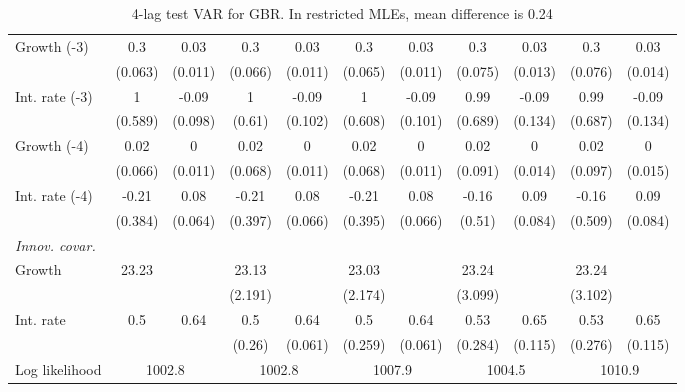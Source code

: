 \begin{table}[htbp]
\begin{tabular}{@{\extracolsep{4pt}}lcccccccccc@{}}
\quad Growth (-3) 	 &0.3 	 & 0.03 	 & 0.3 	 & 0.03 	 & 0.3 	 & 0.03 	 & 0.3 	 & 0.03 	 & 0.3 	 & 0.03	 \\ 
 		 & (0.063) 	 & (0.011) 	 & (0.066) 	 & (0.011) 	 & (0.065) 	 & (0.011) 	 & (0.075) 	 & (0.013) 	 & (0.076) 	 & (0.014) 	 \\ 
\quad Int. rate (-3) 	 &1 	 & -0.09 	 & 1 	 & -0.09 	 & 1 	 & -0.09 	 & 0.99 	 & -0.09 	 & 0.99 	 & -0.09	 \\ 
 		 & (0.589) 	 & (0.098) 	 & (0.61) 	 & (0.102) 	 & (0.608) 	 & (0.101) 	 & (0.689) 	 & (0.134) 	 & (0.687) 	 & (0.134) 	 \\ 
\quad Growth (-4) 	 &0.02 	 & 0 	 & 0.02 	 & 0 	 & 0.02 	 & 0 	 & 0.02 	 & 0 	 & 0.02 	 & 0	 \\ 
 		 & (0.066) 	 & (0.011) 	 & (0.068) 	 & (0.011) 	 & (0.068) 	 & (0.011) 	 & (0.091) 	 & (0.014) 	 & (0.097) 	 & (0.015) 	 \\ 
\quad Int. rate (-4) 	 &-0.21 	 & 0.08 	 & -0.21 	 & 0.08 	 & -0.21 	 & 0.08 	 & -0.16 	 & 0.09 	 & -0.16 	 & 0.09	 \\ 
 		 & (0.384) 	 & (0.064) 	 & (0.397) 	 & (0.066) 	 & (0.395) 	 & (0.066) 	 & (0.51) 	 & (0.084) 	 & (0.509) 	 & (0.084) 	 \\ 
\rule{0pt}{4ex} \emph{Innov. covar.}  	 & 	 & 	 & 	 & 	 & 	 & 	 & 	 & 	 & 	 &\\ 
\quad Growth 	 &23.23 	 &  	 & 23.13 	 &  	 & 23.03 	 &  	 & 23.24 	 &  	 & 23.24 	 & 	 \\ 
 		 &  	 &  	 & (2.191) 	 &  	 & (2.174) 	 &  	 & (3.099) 	 &  	 & (3.102) 	 &  	 \\ 
\quad Int. rate 	 &0.5 	 & 0.64 	 & 0.5 	 & 0.64 	 & 0.5 	 & 0.64 	 & 0.53 	 & 0.65 	 & 0.53 	 & 0.65	 \\ 
 		 &  	 &  	 & (0.26) 	 & (0.061) 	 & (0.259) 	 & (0.061) 	 & (0.284) 	 & (0.115) 	 & (0.276) 	 & (0.115) 	 \\ 
 \hline \rule{0pt}{4ex} 
  Log likelihood 	 &\multicolumn{2}{c}{1002.8} 	 & \multicolumn{2}{c}{1002.8} 	 & \multicolumn{2}{c}{1007.9} 	 & \multicolumn{2}{c}{1004.5} 	 & \multicolumn{2}{c}{1010.9}\\ 

 \hline 	\end{tabular}		\caption{4-lag test VAR for GBR. In restricted MLEs, mean difference is 0.24}
		\label{tab:GBR4lag}

\end{table}